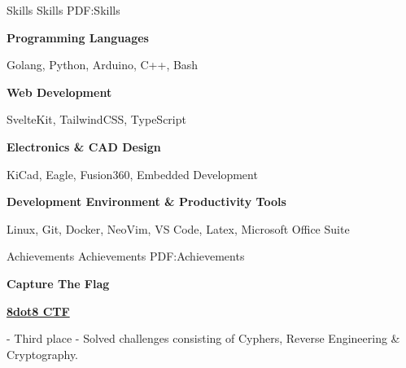 \documentclass[letterpaper,yyyy,draft]{simpleresumecv}
\begin{document}
\begin{Body}

\Section
{Skills}
{Skills}
{PDF:Skills}
{
    {
        \BulletItem
        \textbf{Programming Languages}
        \hfill
        \Gap
        \begin{Detail}
        \SubBulletItem
        Golang, Python, Arduino, C++, Bash
        \end{Detail}
    }

    {
        \Gap
        \BulletItem
        \textbf{Web Development}
        \hfill
        \Gap
        \begin{Detail}
        \SubBulletItem
        SvelteKit, TailwindCSS, TypeScript
        \end{Detail}
    }

    {
        \Gap
        \BulletItem
        \textbf{Electronics \& CAD Design}
        \hfill
        \Gap
        \begin{Detail}
        \SubBulletItem
        KiCad, Eagle, Fusion360, Embedded Development
        \end{Detail}
    }

    {
        \Gap
        \BulletItem
        \textbf{Development Environment \& Productivity Tools}
        \hfill
        \Gap
        \begin{Detail}
        \SubBulletItem
        Linux, Git, Docker, NeoVim, VS Code, Latex, Microsoft Office Suite
        \end{Detail}
    }
}



\Section
{Achievements}
{Achievements}
{PDF:Achievements}
{
    \Entry
    \textbf{Capture The Flag}
    {
        \Gap
        \BulletItem
        \href{https://8dot8.org}{\textbf{8dot8 CTF}}
        \hfill
        \begin{Detail}
         - Third place - Solved challenges consisting of Cyphers, Reverse Engineering \& Cryptography.
        \end{Detail}
    }

}
\end{Body}
\end{document}
